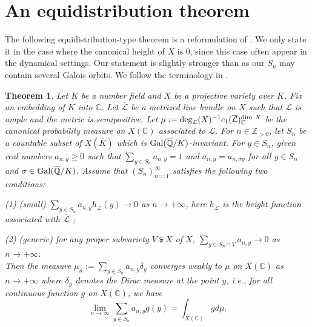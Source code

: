 \documentclass[12pt]{amsart}
\theoremstyle{plain}
\newtheorem{Thm}{Theorem}[section]
\theoremstyle{remark}
\theoremstyle{definition}
\def\Z{\mathbb Z}
\def\Q{\mathbb Q}
\def\C{\mathbb C}
\begin{document}
\section{An equidistribution theorem}\label{sectionequid}
The following equidistribution-type theorem is a reformulation of \cite[Theorem 3.1]{Yuan2008}.
We only state it in the case where the canonical height of $X$ is $0$, since this case often appear in the dynamical settings.  
Our statement is slightly stronger than \cite[Theorem 3.1]{Yuan2008} as our $S_n$ may contain several Galois orbits. 
We follow the terminology in \cite{Yuan2008}. 
\begin{Thm}\label{equid}
	Let $K$ be a number field and $X$ be a projective variety over $K$. Fix an embedding of $K$ into $\C$. 
	Let $\overline{\mathcal{L}}$ be a metrized line bundle on $X$ such that $\mathcal{L}$ is ample and the metric is semipositive. Let $\mu:={\rm deg}_{\mathcal{L}}(X)^{-1}c_1(\overline{\mathcal{L}})^{{\rm dim}\ X}_{\C}$ be the canonical probability measure on $X(\C)$ associated to $\overline{\mathcal{L}}$. For $n\in\Z_{>0}$, let $S_n$ be a countable subset of $X(\overline{K})$ which is ${\rm Gal}(\overline{\Q}/K)$-invariant. For $y\in S_n$, given real numbers $a_{n,y}\geq0$ such that $\sum_{y\in S_n}a_{n,y}=1$ and $a_{n,y}=a_{n,\sigma y}$ for all $y\in S_n$ and $\sigma\in{\rm Gal}(\overline{\Q}/K)$. Assume that $(S_n)_{n=1}^\infty$ satisfies the following two conditions:\par 
	(1) (small) $\sum_{y\in S_n}a_{n,y}h_{\overline{\mathcal{L}}}(y)\to0$ as $n\to +\infty$, here $h_{\overline{\mathcal{L}}}$ is the height function associated with $\overline{\mathcal{L}}$ ;\par 
	(2) (generic) for any proper subvariety $V\subsetneqq X$ of $X$, $\sum_{y\in S_n\cap V}a_{n,y}\to0$ as $n\to +\infty$.\\
	Then the measure $\mu_n:=\sum_{y\in S_{n}}a_{n,y}\delta_y$ converges weakly to $\mu$ on $X(\C)$ as $n\to+\infty$ where $\delta_y$ denotes the Dirac measure at the point $y$, i.e., for all continuous function $g$ on $X(\C)$, we have\begin{equation}\label{2.3}\lim\limits_{n\to\infty}\sum_{y\in S_n}a_{n,y}g(y)=\int_{X(\C)}gd\mu.
	\end{equation}
\end{Thm}
\end{document}
